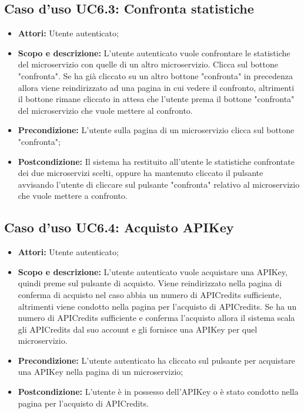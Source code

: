 \documentclass[12pt,a4paper,titlepage]{article}
\begin{document}
	\subsection{Caso d'uso UC6.3: Confronta statistiche}
	\label{UC6.3}
	\begin{itemize}
		\item \textbf{Attori: }Utente autenticato;
		\item \textbf{Scopo e descrizione: }L'utente autenticato vuole confrontare le statistiche del microservizio con quelle di un altro microservizio. Clicca sul bottone "confronta". Se ha già cliccato su un altro bottone "confronta" in precedenza allora viene reindirizzato ad una pagina in cui vedere il confronto, altrimenti il bottone rimane cliccato in attesa che l'utente prema il bottone "confronta" del microservizio che vuole mettere al confronto.
		\item \textbf{Precondizione: }L'utente sulla pagina di un microservizio clicca sul bottone "confronta";
		\item \textbf{Postcondizione: }Il sistema ha restituito all'utente le statistiche confrontate dei due microservizi scelti, oppure ha mantenuto cliccato il pulsante avvisando l'utente di cliccare sul pulsante "confronta" relativo al microservizio che vuole mettere a confronto.
	\end{itemize}
	\subsection{Caso d'uso UC6.4: Acquisto APIKey}
	\label{UC6.4}
	\begin{itemize}
		\item \textbf{Attori: }Utente autenticato;
		\item \textbf{Scopo e descrizione: }L'utente autenticato vuole acquistare una APIKey, quindi preme sul pulsante di acquisto. Viene reindirizzato nella pagina di conferma di acquisto nel caso abbia un numero di APICredits sufficiente, altrimenti viene condotto nella pagina per l'acquisto di APICredits. Se ha un numero di APICredits sufficiente e conferma l'acquisto allora il sistema scala gli APICredits dal suo account e gli fornisce una APIKey per quel microservizio.
		\item \textbf{Precondizione: }L'utente autenticato ha cliccato sul pulsante per acquistare una APIKey nella pagina di un microservizio;
		\item \textbf{Postcondizione: }L'utente è in possesso dell'APIKey o è stato condotto nella pagina per l'acquisto di APICredits.
	\end{itemize}
\end{document}
